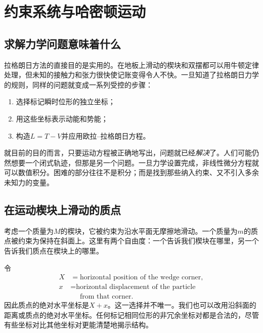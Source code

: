 \chapter{约束系统与哈密顿运动}


\section{求解力学问题意味着什么}

拉格朗日方法的直接目的是实用的。在地板上滑动的楔块和双摆都可以用牛顿定律处理，但未知的接触力和张力很快使记账变得令人不快。一旦知道了拉格朗日力学的规则，同样的问题就变成一系列受控的步骤：
\begin{enumerate}
  \item 选择标记瞬时位形的独立坐标；
  \item 用这些坐标表示动能和势能；
  \item 构造\(L=T-V\)并应用欧拉--拉格朗日方程。
\end{enumerate}

就目前的目的而言，只要运动方程被正确地写出，问题就已经\emph{解决}了。人们可能仍然想要一个闭式轨迹，但那是另一个问题。一旦力学设置完成，非线性微分方程就可以数值积分。困难的部分往往不是积分；而是找到那些纳入约束、又不引入多余未知力的变量。

\section{在运动楔块上滑动的质点}

考虑一个质量为\(M\)的楔块，它被约束为沿水平面无摩擦地滑动。一个质量为\(m\)的质点被约束为保持在斜面上。这里有两个自由度：一个告诉我们楔块在哪里，另一个告诉我们质点在楔块上的哪里。

令
\begin{equation}
  \begin{aligned}
    X&=\text{horizontal position of the wedge corner},\\
    x&=\text{horizontal displacement of the particle}\\[-0.2em]
     &\phantom{={}}\text{from that corner}.
  \end{aligned}
  \label{eq:l6-wedge-coordinates}
\end{equation}
因此质点的绝对水平坐标是\(X+x\)。这一选择并不唯一。我们也可以改用沿斜面的距离或质点的绝对水平坐标。任何标记相同位形的非冗余坐标对都是合法的，尽管有些坐标对比其他坐标对更能清楚地揭示结构。

